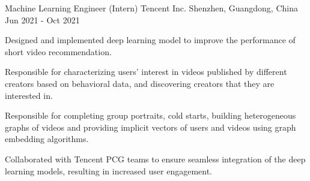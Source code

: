 

\begin{cventries}

  \cventry
    {Machine Learning Engineer (Intern)} %
    {Tencent Inc.} %
    {Shenzhen, Guangdong, China} %
    {Jun 2021 - Oct 2021} %
    {
      \begin{cvitems} %
        \item {Designed and implemented deep learning model to improve the performance of short video recommendation.}
        \item {Responsible for characterizing users' interest in videos published by different creators based on behavioral data, and discovering creators that they are interested in.}
        \item {Responsible for completing group portraits, cold starts, building heterogeneous graphs of videos and providing implicit vectors of users and videos using graph embedding algorithms.}
        \item {Collaborated with Tencent PCG teams to ensure seamless integration of the deep learning models, resulting in increased user engagement.}
      \end{cvitems}
    }

\end{cventries}
